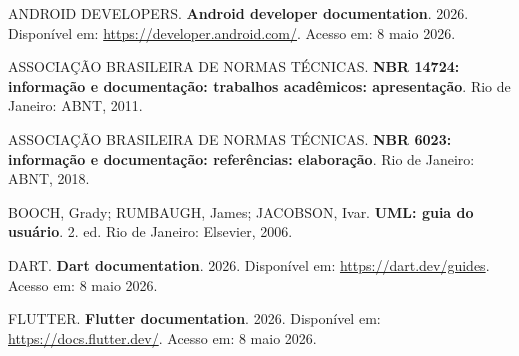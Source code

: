 \documentclass[12pt,oneside,a4paper,brazil,final]{abntex2}
\begin{document}
\begin{SingleSpace}

\setlength{\parindent}{0cm}



\noindent

ANDROID DEVELOPERS. \textbf{Android developer documentation}. 2026. Disponível em: \url{https://developer.android.com/}. Acesso em: 8 maio 2026.



\vspace{0.5cm}



\noindent

ASSOCIAÇÃO BRASILEIRA DE NORMAS TÉCNICAS. \textbf{NBR 14724: informação e documentação: trabalhos acadêmicos: apresentação}. Rio de Janeiro: ABNT, 2011.



\vspace{0.5cm}



\noindent

ASSOCIAÇÃO BRASILEIRA DE NORMAS TÉCNICAS. \textbf{NBR 6023: informação e documentação: referências: elaboração}. Rio de Janeiro: ABNT, 2018.



\vspace{0.5cm}



\noindent

BOOCH, Grady; RUMBAUGH, James; JACOBSON, Ivar. \textbf{UML: guia do usuário}. 2. ed. Rio de Janeiro: Elsevier, 2006.



\vspace{0.5cm}



\noindent

DART. \textbf{Dart documentation}. 2026. Disponível em: \url{https://dart.dev/guides}. Acesso em: 8 maio 2026.



\vspace{0.5cm}



\noindent

FLUTTER. \textbf{Flutter documentation}. 2026. Disponível em: \url{https://docs.flutter.dev/}. Acesso em: 8 maio 2026.



\vspace{0.5cm}




\end{SingleSpace}
\end{document}
